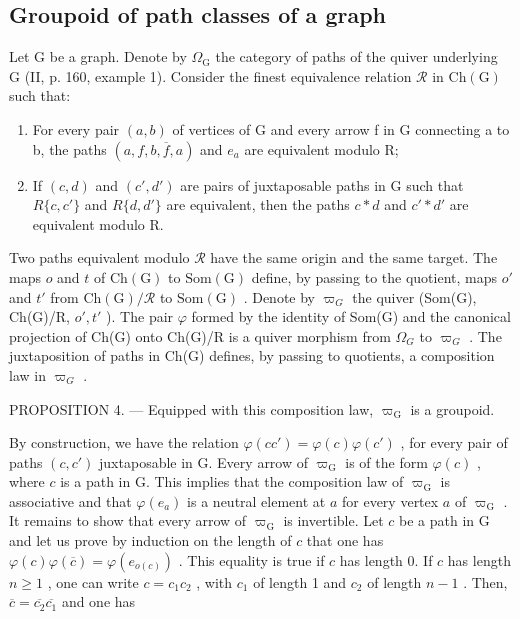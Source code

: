 \subsection{Groupoid of path classes of a graph}

Let G be a graph. Denote by \(\Omega_{\mathrm{G}}\) the category of paths of the quiver underlying G (II, p. 160, example 1). Consider the finest equivalence relation \(\mathcal{R}\) in \(\mathrm{Ch(G)}\) such that:

\begin{enumerate}
\def\labelenumi{(\roman{enumi})}
\item
  For every pair \((a,b)\) of vertices of G and every arrow f in G connecting a to b, the paths \((a,f,b,\overline{f},a)\) and \(e_{a}\) are equivalent modulo R;
\item
  If \((c,d)\) and \((c',d')\) are pairs of juxtaposable paths in G such that \(R\{c,c'\}\) and \(R\{d,d'\}\) are equivalent, then the paths \(c*d\) and \(c'*d'\) are equivalent modulo R.
\end{enumerate}

Two paths equivalent modulo \(\mathcal{R}\) have the same origin and the same target. The maps \(o\) and \(t\) of \(\mathrm{Ch(G)}\) to \(\mathrm{Som(G)}\) define, by passing to the quotient, maps \(o'\) and \(t'\) from \(\mathrm{Ch(G)/\mathcal{R}}\) to \(\mathrm{Som(G)}\) . Denote by \(\varpi_{G}\) the quiver (Som(G), Ch(G)/R, \(o', t'\) ). The pair \(\varphi\) formed by the identity of Som(G) and the canonical projection of Ch(G) onto Ch(G)/R is a quiver morphism from \(\Omega_{G}\) to \(\varpi_{G}\) . The juxtaposition of paths in Ch(G) defines, by passing to quotients, a composition law in \(\varpi_{G}\) .

PROPOSITION 4. --- Equipped with this composition law, \(\varpi_{\mathrm{G}}\) is a groupoid.

By construction, we have the relation \(\varphi(cc') = \varphi(c)\varphi(c')\) , for every pair of paths \((c,c')\) juxtaposable in G. Every arrow of \(\varpi_{\mathrm{G}}\) is of the form \(\varphi(c)\) , where \(c\) is a path in G. This implies that the composition law of \(\varpi_{\mathrm{G}}\) is associative and that \(\varphi(e_a)\) is a neutral element at \(a\) for every vertex \(a\) of \(\varpi_{\mathrm{G}}\) . It remains to show that every arrow of \(\varpi_{\mathrm{G}}\) is invertible. Let \(c\) be a path in G and let us prove by induction on the length of \(c\) that one has \(\varphi(c)\varphi(\overline{c}) = \varphi(e_{o(c)})\) . This equality is true if \(c\) has length 0. If \(c\) has length \(n \geqslant 1\) , one can write \(c = c_1c_2\) , with \(c_1\) of length 1 and \(c_2\) of length \(n - 1\) . Then, \(\overline{c} = \overline{c_2}\overline{c_1}\) and one has

